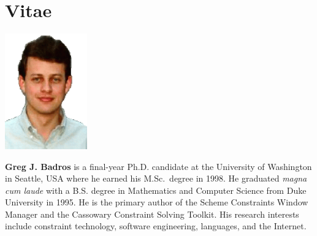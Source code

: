 \documentclass{article}
\begin{document}
\begin{multicols}{2}
% 


% 


{\small
}



\section*{Vitae}
\begin{floatingfigure}[l]{1.2in}
\hspace*{-.8cm}
\includegraphics[width=1.4in]{gjb-face.eps}
\end{floatingfigure}
\textbf{Greg J. Badros} is a final-year Ph.D. candidate at the
University of Washington in Seattle, USA where he earned his
M.Sc.\  degree in 1998.  He graduated \textit{magna cum laude} with a B.S.
degree in Mathematics and Computer Science from
Duke University in 1995.  He is the primary author of the 
Scheme Constraints Window Manager and the 
Cassowary Constraint Solving Toolkit.  His research interests include
constraint technology, software engineering, languages, and the
Internet.

\end{multicols}
\end{document}
